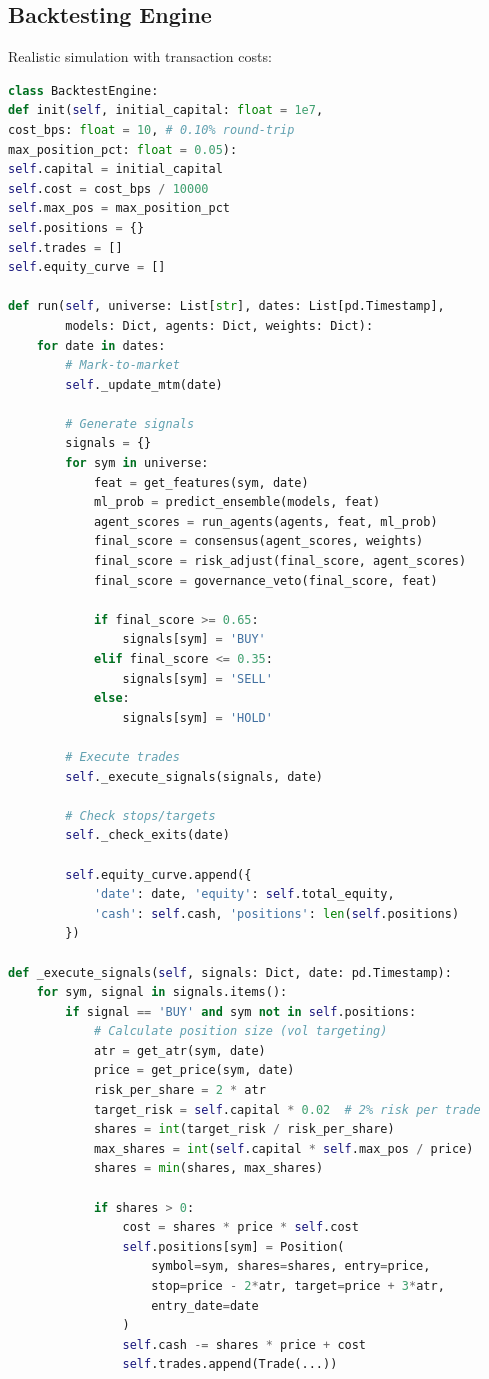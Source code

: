 \documentclass[12pt,a4paper]{report}
\begin{document}
\subsection{Backtesting Engine}
Realistic simulation with transaction costs:
\begin{lstlisting}[language=Python, caption=Backtest Engine Core]
class BacktestEngine:
def init(self, initial_capital: float = 1e7,
cost_bps: float = 10, # 0.10% round-trip
max_position_pct: float = 0.05):
self.capital = initial_capital
self.cost = cost_bps / 10000
self.max_pos = max_position_pct
self.positions = {}
self.trades = []
self.equity_curve = []

def run(self, universe: List[str], dates: List[pd.Timestamp],
        models: Dict, agents: Dict, weights: Dict):
    for date in dates:
        # Mark-to-market
        self._update_mtm(date)

        # Generate signals
        signals = {}
        for sym in universe:
            feat = get_features(sym, date)
            ml_prob = predict_ensemble(models, feat)
            agent_scores = run_agents(agents, feat, ml_prob)
            final_score = consensus(agent_scores, weights)
            final_score = risk_adjust(final_score, agent_scores)
            final_score = governance_veto(final_score, feat)

            if final_score >= 0.65:
                signals[sym] = 'BUY'
            elif final_score <= 0.35:
                signals[sym] = 'SELL'
            else:
                signals[sym] = 'HOLD'

        # Execute trades
        self._execute_signals(signals, date)

        # Check stops/targets
        self._check_exits(date)

        self.equity_curve.append({
            'date': date, 'equity': self.total_equity,
            'cash': self.cash, 'positions': len(self.positions)
        })

def _execute_signals(self, signals: Dict, date: pd.Timestamp):
    for sym, signal in signals.items():
        if signal == 'BUY' and sym not in self.positions:
            # Calculate position size (vol targeting)
            atr = get_atr(sym, date)
            price = get_price(sym, date)
            risk_per_share = 2 * atr
            target_risk = self.capital * 0.02  # 2% risk per trade
            shares = int(target_risk / risk_per_share)
            max_shares = int(self.capital * self.max_pos / price)
            shares = min(shares, max_shares)

            if shares > 0:
                cost = shares * price * self.cost
                self.positions[sym] = Position(
                    symbol=sym, shares=shares, entry=price,
                    stop=price - 2*atr, target=price + 3*atr,
                    entry_date=date
                )
                self.cash -= shares * price + cost
                self.trades.append(Trade(...))
\end{lstlisting}
\end{document}
